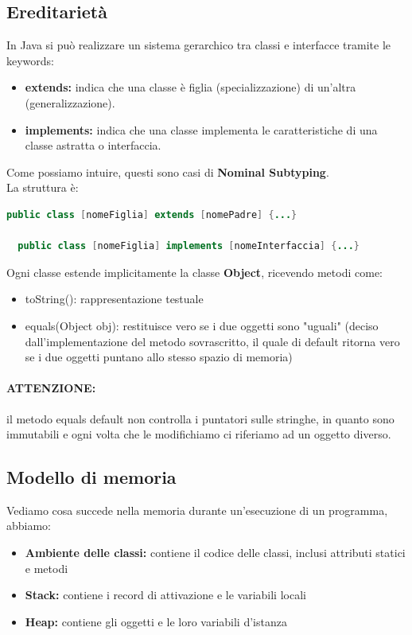 \documentclass[12pt,a4paper]{article}
\begin{document}
\subsection{Ereditarietà}
In Java si può realizzare un sistema gerarchico tra classi e interfacce tramite le keywords:
\begin{itemize}
  \item \textbf{extends:} indica che una classe è figlia (specializzazione) di un'altra (generalizzazione).
  \item \textbf{implements:} indica che una classe implementa le caratteristiche di una classe astratta o interfaccia.
\end{itemize}
Come possiamo intuire, questi sono casi di \textbf{Nominal Subtyping}.\\
La struttura è:
\begin{lstlisting}[language=Java]
  public class [nomeFiglia] extends [nomePadre] {...}

  public class [nomeFiglia] implements [nomeInterfaccia] {...}
\end{lstlisting}
Ogni classe estende implicitamente la classe \textbf{Object}, ricevendo metodi come:
\begin{itemize}
  \item toString(): rappresentazione testuale
  \item equals(Object obj): restituisce vero se i due oggetti sono "uguali" (deciso dall'implementazione del metodo sovrascritto, il quale di default ritorna vero se i due oggetti puntano allo stesso spazio di memoria)
\end{itemize}
\paragraph{ATTENZIONE:} il metodo equals default non controlla i puntatori sulle stringhe, in quanto sono immutabili e ogni volta che le modifichiamo ci riferiamo ad un oggetto diverso.


\subsection{Modello di memoria}
Vediamo cosa succede nella memoria durante un'esecuzione di un programma, abbiamo:
\begin{itemize}
  \item \textbf{Ambiente delle classi:} contiene il codice delle classi, inclusi attributi statici e metodi
  \item \textbf{Stack:} contiene i record di attivazione e le variabili locali
  \item \textbf{Heap:} contiene gli oggetti e le loro variabili d'istanza
\end{itemize}
\end{document}
